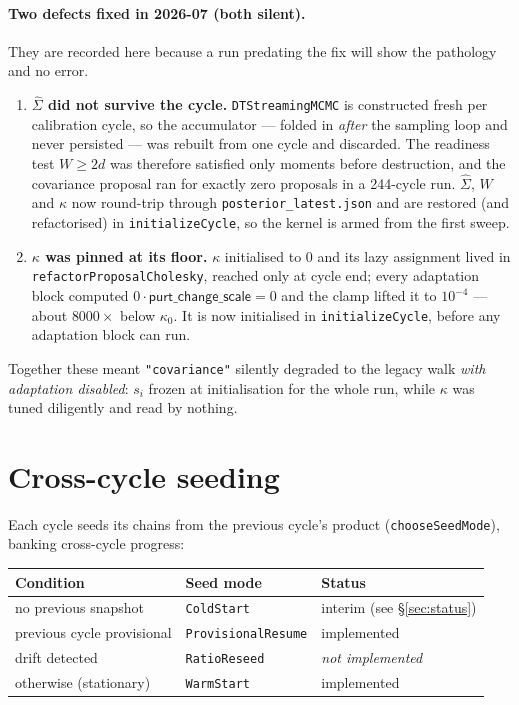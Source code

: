 \documentclass[11pt]{article}
\newcommand{\code}[1]{\texttt{\small #1}}
\newcommand{\param}[1]{\textsf{#1}}
\newcommand{\stub}[1]{{\color{stubgray}\textit{#1}}}
\begin{document}
\paragraph{Two defects fixed in 2026-07 (both silent).} They are recorded
here because a run predating the fix will show the pathology and no error.
\begin{enumerate}[leftmargin=1.6em,nosep]
  \item \textbf{$\hat\Sigma$ did not survive the cycle.} \code{DTStreamingMCMC}
  is constructed fresh per calibration cycle, so the accumulator --- folded
  in \emph{after} the sampling loop and never persisted --- was rebuilt from
  one cycle and discarded. The readiness test $W\ge 2d$ was therefore
  satisfied only moments before destruction, and the covariance proposal ran
  for exactly zero proposals in a 244-cycle run. $\hat\Sigma$, $W$ and
  $\kappa$ now round-trip through \code{posterior\_latest.json} and are
  restored (and refactorised) in \code{initializeCycle}, so the kernel is
  armed from the first sweep.
  \item \textbf{$\kappa$ was pinned at its floor.} $\kappa$ initialised to
  $0$ and its lazy assignment lived in \code{refactorProposalCholesky},
  reached only at cycle end; every adaptation block computed
  $0\cdot\param{purt\_change\_scale}=0$ and the clamp lifted it to
  $10^{-4}$ --- about $8000\times$ below $\kappa_0$. It is now initialised
  in \code{initializeCycle}, before any adaptation block can run.
\end{enumerate}
Together these meant \code{"covariance"} silently degraded to the legacy
walk \emph{with adaptation disabled}: $s_i$ frozen at initialisation for the
whole run, while $\kappa$ was tuned diligently and read by nothing.

\section{Cross-cycle seeding}\label{sec:seeding}

Each cycle seeds its chains from the previous cycle's product
(\code{chooseSeedMode}), banking cross-cycle progress:
\begin{center}
\begin{tabular}{@{}lll@{}}
\toprule
Condition & Seed mode & Status\\
\midrule
no previous snapshot        & \code{ColdStart}          & interim (see \S\ref{sec:status})\\
previous cycle provisional  & \code{ProvisionalResume}  & implemented\\
drift detected              & \code{RatioReseed}        & \stub{not implemented}\\
otherwise (stationary)      & \code{WarmStart}          & implemented\\
\bottomrule
\end{tabular}
\end{center}
\end{document}
